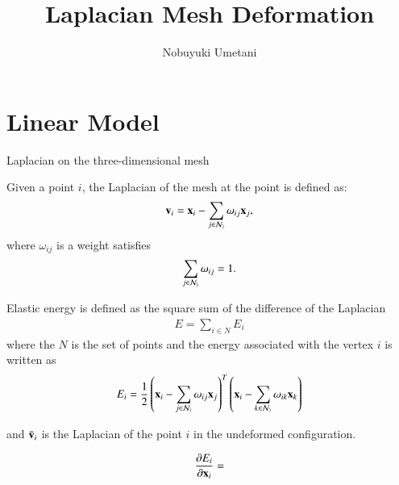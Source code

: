 
\title{Laplacian Mesh Deformation}
\author{Nobuyuki Umetani}


\maketitle

\tableofcontents

\section{Linear Model}

Laplacian on the three-dimensional mesh 

Given a point $i$, the Laplacian of the mesh at the point is defined as:
%
\begin{equation}
    \mathbf{v}_i = \mathbf{x}_i - \sum_{j\in \cal{N}_i} \omega_{ij} \mathbf{x}_j,
\end{equation}
%
where $\omega_{ij}$ is a weight satisfies
%
\begin{equation}
    \sum_{j\in \cal{N}_i} \omega_{ij} = 1.
\end{equation}

Elastic energy is defined as the square sum of the difference of the Laplacian
\begin{eqnarray}
    E = \sum_{i\in N}E_i
\end{eqnarray}
where the $N$ is the set of points and the energy associated with the vertex $i$ is written as
\begin{eqnarray}
    E_i = \frac{1}{2}\left(\mathbf{x}_i - \sum_{j\in \cal{N}_i} \omega_{ij} \mathbf{x}_j\right)^T \left(\mathbf{x}_i - \sum_{k\in \cal{N}_i} \omega_{ik} \mathbf{x}_k\right)
\end{eqnarray}

 and $\bar{\mathbf{v}}_i$ is the Laplacian of the point $i$ in the undeformed configuration.

\begin{eqnarray}
    \frac{\partial E_i}{\partial \mathbf{x}_i} = 
\end{eqnarray}





